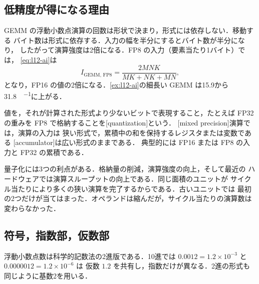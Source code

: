 \documentclass[../main.tex]{subfiles}
\begin{document}
\subsection{低精度が得になる理由}

GEMM の浮動小数点演算の回数は形状で決まり，形式には依存しない．移動する
バイト数は形式に依存する．入力の幅を半分にするとバイト数が半分になり，
したがって演算強度は2倍になる．FP8 の入力（要素当たり1バイト）では，
\cref{eq:l12-ai}は
\begin{equation}
  I_{\text{GEMM, FP8}} = \frac{2MNK}{MK + NK + MN} ,
  \label{eq:l12-ai-fp8}
\end{equation}
となり，FP16 の値の2倍になる．\cref{ex:l12-ai}の細長い GEMM は15.9から
\SI{31.8}{\flop\per\byte}に上がる．

\begin{definition}
  値を，それが計算された形式より少ないビットで表現すること，たとえば FP32
  の重みを FP8 で格納することを[quantization]という．
  [mixed precision]演算では，演算の入力は
  狭い形式で，累積中の和を保持するレジスタまたは変数である
  [accumulator]は広い形式のままである．
  典型的には FP16 または FP8 の入力と FP32 の累積である．
\end{definition}

量子化には3つの利点がある．格納量の削減，演算強度の向上，そして最近の
ハードウェアでは演算スループットの向上である．同じ面積のユニットが
サイクル当たりにより多くの狭い演算を完了するからである．古いユニットでは
最初の2つだけが当てはまった．オペランドは縮んだが，サイクル当たりの演算数は
変わらなかった．

\subsection{符号，指数部，仮数部}

浮動小数点数は科学的記数法の2進版である．10進では
$0.0012 = 1.2 \times 10^{-3}$ と $0.0000012 = 1.2 \times 10^{-6}$ は
仮数 $1.2$ を共有し，指数だけが異なる．2進の形式も同じように基数2を用いる．
\end{document}
